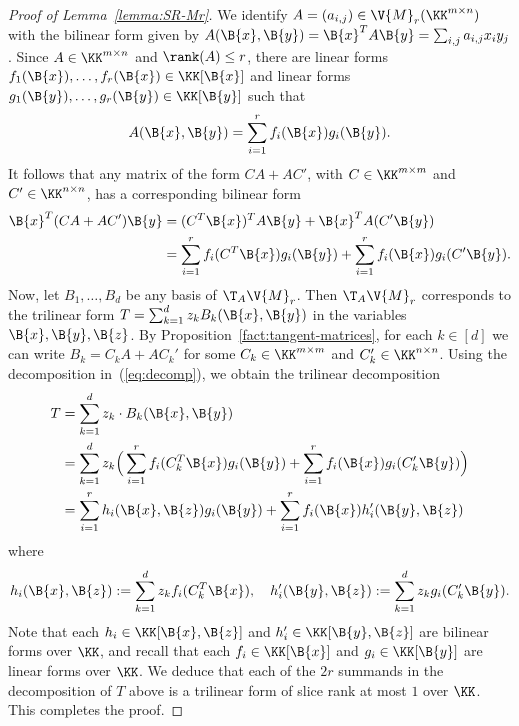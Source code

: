 \begin{proof}[Proof of Lemma~\ref{lemma:SR-Mr}]
	We identify $A=(a_{i,j}) \in \V{M}_r(\KK^{m \times n})$ with the bilinear form given by $A(\B{x},\B{y}) = \B{x}^T A \B{y} = \sum_{i,j} a_{i,j} x_i y_j$.
	Since $A \in \KK^{m \times n}$ and $\rank(A) \le r$, there are linear forms $f_1(\B{x}),\ldots,f_r(\B{x}) \in \KK[\B{x}]$ and linear forms $g_1(\B{y}),\ldots,g_r(\B{y}) \in \KK[\B{y}]$ such that
	$$A(\B{x},\B{y}) = \sum_{i=1}^r f_i(\B{x})g_i(\B{y}) .$$
	It follows that any matrix of the form $C A + A C'$, with $C \in \KK^{m\times m}$ and $C' \in \KK^{n \times n}$, has a corresponding bilinear form
	\begin{align}\label{eq:decomp}
		\begin{split}
			\B{x}^T (C A + A C') \B{y} 
			&= (C^T\B{x})^T A \B{y} + \B{x}^T A (C'\B{y})\\
			&= \sum_{i=1}^r f_i(C^T\B{x})g_i(\B{y}) + \sum_{i=1}^r f_i(\B{x})g_i(C'\B{y}) .
		\end{split}
	\end{align}
	Now, let $B_1,\ldots,B_d$ be any basis of $\T_A \V{M}_r$. 
	Then $\T_A \V{M}_r$ corresponds to the trilinear form $T=\sum_{k=1}^d z_k B_k(\B{x},\B{y})$ in the variables $\B{x},\B{y},\B{z}$. 
	By Proposition~\ref{fact:tangent-matrices}, 
	for each $k \in [d]$ we can write $B_k = C_kA+AC_k'$ for some $C_k \in \KK^{m\times m}$ and $C'_k \in \KK^{n \times n}$.
	Using the decomposition in~(\ref{eq:decomp}), we obtain the trilinear decomposition
	\begin{align*}
		T &= \sum_{k=1}^d z_k \cdot B_k(\B{x},\B{y})\\
		&= \sum_{k=1}^d z_k\Big(\sum_{i=1}^r f_i(C_k^T\B{x})g_i(\B{y}) + \sum_{i=1}^r f_i(\B{x})g_i(C_k'\B{y})\Big)\\
		&= \sum_{i=1}^r h_i(\B{x},\B{z}) g_i(\B{y}) + \sum_{i=1}^r f_i(\B{x})h'_i(\B{y},\B{z}) 
	\end{align*}
	where
	$$h_i(\B{x},\B{z}) := \sum_{k=1}^d z_kf_i(C_k^T\B{x}),\quad 
	h'_i(\B{y},\B{z}) := \sum_{k=1}^d z_k g_i(C_k'\B{y}) .$$
	Note that each $h_i \in \KK[\B{x},\B{z}]$ and $h'_i \in \KK[\B{y},\B{z}]$ are bilinear forms over $\KK$, 
	and recall that each $f_i \in \KK[\B{x}]$ and $g_i \in \KK[\B{y}]$ are linear forms over $\KK$.
	We deduce that each of the $2r$ summands in the decomposition of $T$ above is a trilinear form of slice rank at most $1$ over $\KK$.
	This completes the proof.
\end{proof}







